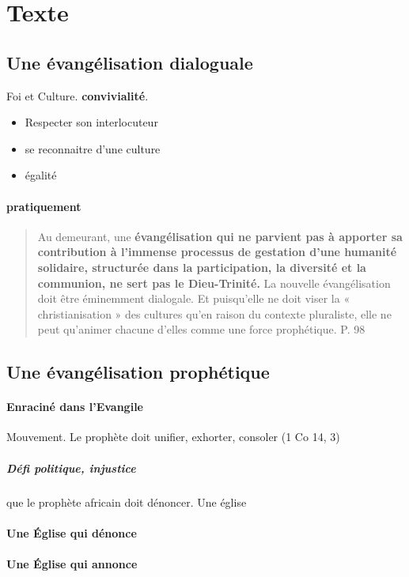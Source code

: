 \section{Texte}
\subsection{Une évangélisation dialoguale} Foi et Culture. 
\textbf{convivialité}. 
\begin{itemize}
    \item Respecter son interlocuteur
    \item se reconnaitre d'une culture
    \item égalité
\end{itemize}

\paragraph{pratiquement}
\begin{quote}
    Au demeurant, une \textbf{évangélisation qui ne parvient pas à
apporter sa contribution à l'immense processus de gestation
d'une humanité solidaire, structurée dans la participation, la
diversité et la communion, ne sert pas le Dieu-Trinité.} La nouvelle
évangélisation doit être éminemment dialogale. Et puisqu'elle
ne doit viser la « christianisation » des cultures qu'en
raison du contexte pluraliste, elle ne peut qu'animer chacune
d'elles comme une force prophétique. P. 98
\end{quote}

\subsection{Une évangélisation prophétique}
\paragraph{Enraciné dans l'Evangile}  Mouvement. Le prophète doit unifier, exhorter, consoler (1 Co 14, 3)

\subparagraph{Défi politique, injustice} que le prophète africain doit dénoncer. Une église


\paragraph{Une Église qui dénonce} 



 
\paragraph{Une Église qui annonce}

